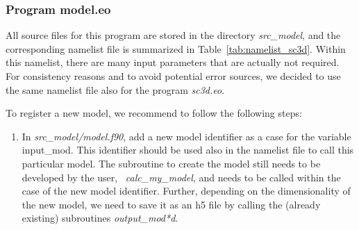 \documentclass[10pt,a4paper]{article}
\begin{document}
\subsubsection{Program model.eo}
All source files for this program are stored in the directory
\textit{src\_model}, and the corresponding namelist file is summarized
in Table~\ref{tab:namelist_sc3d}. Within this namelist, there are many
input parameters that are actually not required. For consistency
reasons and to avoid potential error sources, we decided to use the
same namelist file also for the program \textit{sc3d.eo}.

To register a new model, we recommend to follow the following steps:
\begin{enumerate}
\item In \textit{src\_model/model.f90}, add a new model identifier as
  a case for the variable input\_mod. This identifier should be used
  also in the namelist file to call this particular model.
  The subroutine to create the model still needs to be developed by
  the user, \eg~\textit{calc\_my\_model}, and needs to be called within the case
  of the new model identifier. Further, depending on the
  dimensionality of the new model, we need to save it as an h5 file by
  calling the (already existing) subroutines \textit{output\_mod*d}.
  

\end{enumerate}
\end{document}
